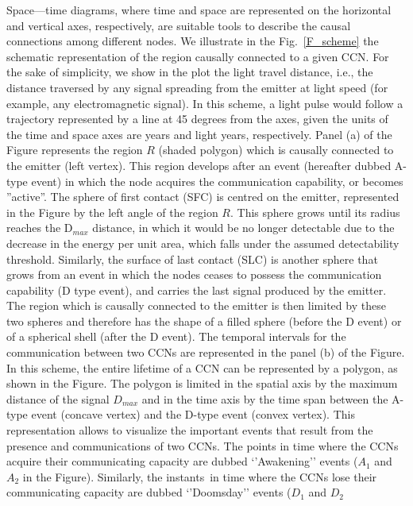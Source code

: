 \documentclass[crop]{CSLB}
\newcommand{\ceti}{CCN}
\newcommand{\cetis}{CCNs}
\newcommand{\ffn}[1]{}
\begin{document}
\ffn{1} Space—time diagrams, where time and space are represented on
the horizontal and vertical axes, respectively, are suitable tools to
describe the causal connections among different nodes.
%
We illustrate in the Fig.~\ref{F_scheme} the schematic representation
of the region causally connected to a given \ceti{}.
%
For the sake of simplicity, we show in the plot the light travel
distance, i.e., the distance traversed by any signal spreading from
the emitter at light speed (for example, any electromagnetic signal).
%
In this scheme, a light pulse would follow a trajectory represented by
a line at 45 degrees from the axes, given the units of the time and
space axes are years and light years, respectively.
%
Panel (a) of the Figure represents the region $R$ (shaded polygon)
which is causally connected to the emitter (left vertex).
%
This region develops after an event (hereafter dubbed A-type event) in
which the node acquires the communication capability, or becomes
''active''.
%
The sphere of first contact (SFC) is centred on the emitter,
represented in the Figure by the left angle of the region $R$.
%
This sphere grows until its radius reaches the D$_{max}$ distance, in
which it would be no longer detectable due to the decrease in the
energy per unit area, which falls under the assumed detectability
threshold.
%
Similarly, the surface of last contact (SLC) is another sphere that
grows from an event in which the nodes ceases to possess the
communication capability (D type event), and carries the last signal
produced by the emitter.
%
The region which is causally connected to the emitter is then limited
by these two spheres and therefore has the shape of a filled sphere
(before the D event) or of a spherical shell (after the D event).
%
The temporal intervals for the communication between two \cetis{} are
represented in the panel (b) of the Figure.
%
In this scheme, the entire lifetime of a \ceti{} can be represented by
a polygon, as shown in the Figure.
%
The polygon is limited in the spatial axis by the maximum distance of
the signal $D_{max}$ and in the time axis by the time span between the
A-type event (concave vertex) and the D-type event (convex vertex).
%
This representation allows to visualize the important events that
result from the presence and communications of two \cetis{}.
%
The points in time where the \cetis{} acquire their communicating
capacity are dubbed ‘’Awakening’’ events ($A_1$ and $A_2$ in the
Figure).
%
Similarly, the instants in time where the \cetis{} lose their
communicating capacity are dubbed ‘’Doomsday’’ events ($D_1$ and $D_2$
\end{document}
